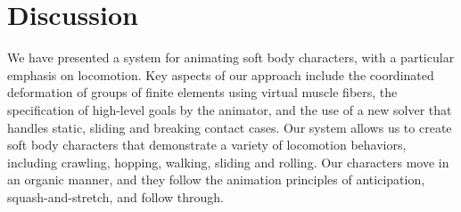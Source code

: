 \section{Discussion}
\label{sec:softEvaluation}

We have presented a system for animating soft body characters, with a
particular emphasis on locomotion.  Key aspects of our approach include
the coordinated deformation of groups of finite elements using virtual
muscle fibers, the specification of high-level goals by the animator, and
the use of a new solver that handles static, sliding and breaking contact
cases.  Our system allows us to create soft body characters that
demonstrate a variety of locomotion behaviors, including crawling,
hopping, walking, sliding and rolling.  Our characters move in an organic
manner, and they follow the animation principles of anticipation,
squash-and-stretch, and follow through.

